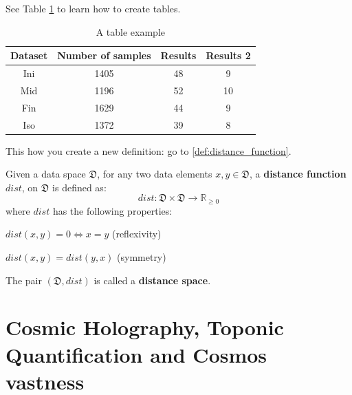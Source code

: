 See Table \ref{table:table_ex} to learn how to create tables.

\begin{table}
\centering
\caption{A table example}
\begin{tabular}{ c c c c }
\toprule
\textbf{Dataset} & \textbf{Number of samples} & \textbf{Results} & \textbf{Results 2} \\
\midrule                 
  Ini & 1405 & 48 & 9 \\ 
  Mid & 1196 & 52 & 10 \\ 
  Fin & 1629 & 44 & 9 \\ 
  Iso & 1372 & 39 & 8 \\ 
  \bottomrule
\end{tabular}
\label{table:table_ex} 
\end{table}

This how you create a new definition: go to \ref{def:distance_function}.

\begin{definition}
Given a data space $\mathfrak{D}$, for any two data elements $x,y \in \mathfrak{D}$, a \textbf{distance function} $dist$, on $\mathfrak{D}$ is defined as:
\begin{equation}
dist: \mathfrak{D} \times \mathfrak{D} \longrightarrow \mathds{R}_{\geq 0} 
\end{equation}
where $dist$ has the following properties:
\begin{compactitem}
\item $dist(x,y)=0 \Leftrightarrow x=y$ (reflexivity)
\item $dist(x,y) = dist(y,x)$ (symmetry)
\end{compactitem}
The pair $(\mathfrak{D},dist)$ is called a \textbf{distance space}.
\label{def:distance_function}
\end{definition}


\section {Cosmic Holography, Toponic Quantification and Cosmos vastness}

